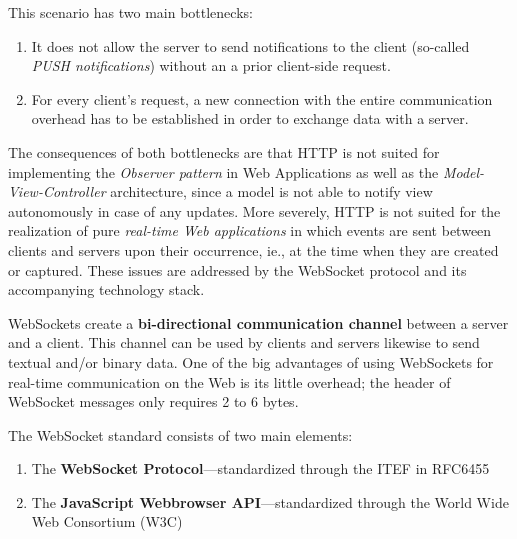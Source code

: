 \documentclass[a4paper, justified, notoc]{tufte-handout} %
\newcommand{\note}[1] {
	\marginnote{\textbf{Note:}\quad #1 } }
\begin{document}
This scenario has two main bottlenecks:
\begin{enumerate}
	\item It does not allow the server to send notifications to the client (so-called \emph{PUSH notifications}) without an a prior client-side request.
	\item For every client's request, a new connection with the entire communication overhead has to be established in order to exchange data with a server.
\end{enumerate}

The consequences of both bottlenecks are that HTTP is not suited for implementing the \emph{Observer pattern} in Web Applications as well as the \emph{Model-View-Controller} architecture, since a model is not able to notify view autonomously in case of any updates. More severely, HTTP is not suited for the realization of pure \emph{real-time Web applications} in which events are sent between clients and servers upon their occurrence, ie., at the time when they are created or captured. 
These issues are addressed by the WebSocket protocol and its accompanying technology stack.

WebSockets create a \textbf{bi-directional communication channel} between a server and a client. This channel can be used by clients and servers likewise to send textual and/or binary data. 
One of the big advantages of using WebSockets for real-time communication on the Web is its little overhead; the header of WebSocket messages only requires 2 to 6 bytes. 

The WebSocket standard consists of two main elements:
\begin{enumerate}
	\item The \textbf{WebSocket Protocol}---standardized through the ITEF in RFC6455
	\item The \textbf{JavaScript Webbrowser API}---standardized through the World Wide Web Consortium (W3C) 
\end{enumerate}

\end{document}
